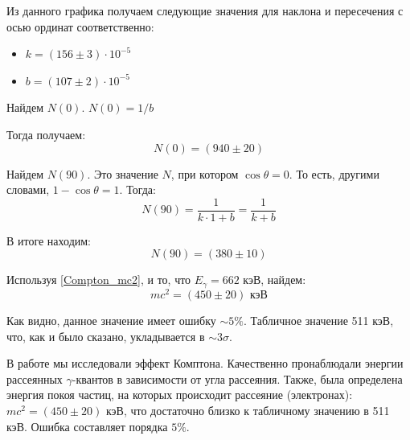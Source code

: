 	Из данного графика получаем следующие значения для наклона и пересечения с осью ординат соответственно:
	\begin{itemize}
		\item $k = (156 \pm 3) \cdot 10^{-5}$
		
		\item $b = (107 \pm 2) \cdot 10^{-5}$
	\end{itemize}
	
	Найдем $N(0)$. $N(0) = 1/b$

	Тогда получаем:
	\begin{equation*}
		\boxed{N(0) = (940 \pm 20)}
	\end{equation*}

	Найдем $N(90)$. Это значение $N$, при котором $\cos\theta = 0$. То есть, другими словами, $1 - \cos\theta = 1$. Тогда:
	\begin{equation*}
		N(90) = \frac{1}{k \cdot 1 + b} = \frac{1}{k + b}
	\end{equation*}

	В итоге находим:
	\begin{equation*}
		\boxed{N(90) = (380 \pm 10)}
	\end{equation*}

	
	Используя \eqref{Compton_mc2}, и то, что $E_\gamma = 662$ кэВ, найдем:
	\begin{equation*}
		\boxed{mc^2 = (450 \pm 20)\text{ кэВ}}
	\end{equation*}

	Как видно, данное значение имеет ошибку $\sim 5\%$. Табличное значение 511 кэВ, что, как и было сказано, укладывается в $\sim 3\sigma$.
	
	\newpage
	В работе мы исследовали эффект Комптона. Качественно пронаблюдали энергии рассеянных $\gamma$-квантов в зависимости от угла рассеяния. Также, была определена энергия покоя частиц, на которых происходит рассеяние (электронах): $mc^2 = (450 \pm 20)\text{ кэВ}$, что достаточно близко к табличному значению в 511 кэВ. Ошибка составляет порядка $5\%$.
	
	
